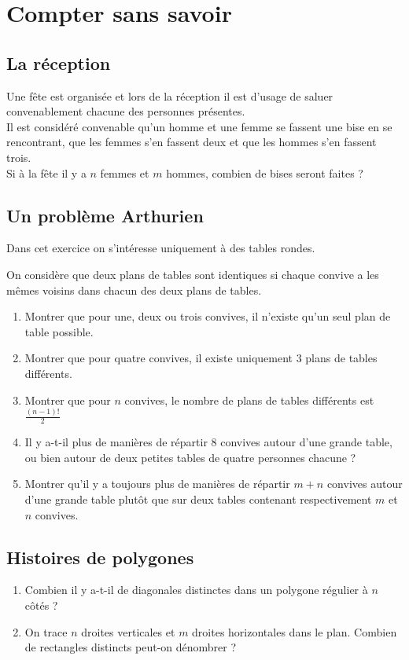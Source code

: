 \documentclass[oneside,12pt]{article}          %
\begin{document}
\section{Compter sans savoir}

\subsection{La réception}
Une fête est organisée et lors de la réception il est d'usage de saluer convenablement chacune des personnes présentes.\\[5pt]
Il est considéré convenable qu'un homme et une femme se fassent une bise en se rencontrant, que les femmes s'en fassent deux et que les hommes s'en fassent trois.\\[5pt]
Si à la fête il y a $n$ femmes et $m$ hommes, combien de bises seront faites ?



\subsection{Un problème Arthurien}
Dans cet exercice on s'intéresse uniquement à des tables rondes.

On considère que deux plans de tables sont identiques si chaque convive a les mêmes voisins dans chacun des deux plans de tables.
\begin{enumerate}
    \item Montrer que pour une, deux ou trois convives, il n'existe qu'un seul plan de table possible.
    \item Montrer que pour quatre convives, il existe uniquement 3 plans de tables différents.
    \item Montrer que pour $n$ convives, le nombre de plans de tables différents est $\frac{(n-1)!}{2}$
    \item Il y a-t-il plus de manières de répartir 8 convives autour d'une grande table, ou bien autour de deux petites tables de quatre personnes chacune ?
    \item Montrer qu'il y a toujours plus de manières de répartir $m+n$ convives autour d'une grande table plutôt que sur deux tables contenant respectivement $m$ et $n$ convives.
\end{enumerate}



\subsection{Histoires de polygones}
\begin{enumerate}
    \item Combien il y a-t-il de diagonales distinctes dans un polygone régulier à $n$ côtés ?
    \item On trace $n$ droites verticales et $m$ droites horizontales dans le plan. Combien de rectangles distincts peut-on dénombrer ?
\end{enumerate}
\end{document}
